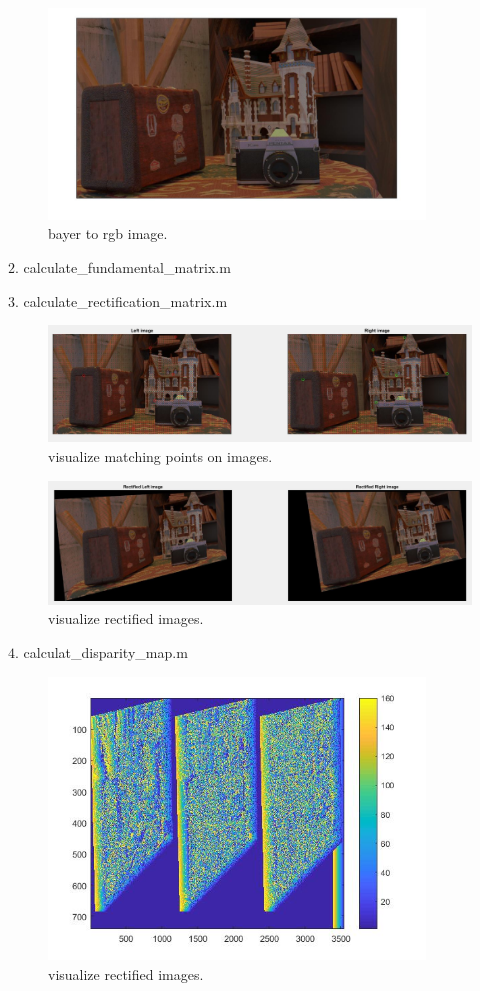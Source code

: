 \begin{figure}[!h]
    \centering
    \includegraphics[width=10cm]{1.jpg}
    \caption{bayer to rgb image.}
    \label{fig:result2}
\end{figure}

\newpage
{\large $2.$ calculate\_fundamental\_matrix.m \par}
{\large $3.$ calculate\_rectification\_matrix.m \par}
\begin{figure}[!h]
    \centering
    \includegraphics[width=14cm]{22.jpg}
    \caption{visualize matching points on images.}
    \label{fig:result3}
\end{figure}

\begin{figure}[!h]
    \centering
    \includegraphics[width=14cm]{33.jpg}
    \caption{visualize rectified images.}
    \label{fig:result4}
\end{figure}

{\large $4.$ calculat\_disparity\_map.m \par}
\begin{figure}[!h]
    \centering
    \includegraphics[width=10cm]{5.jpg}
    \caption{visualize rectified images.}
    \label{fig:result5}
\end{figure}

